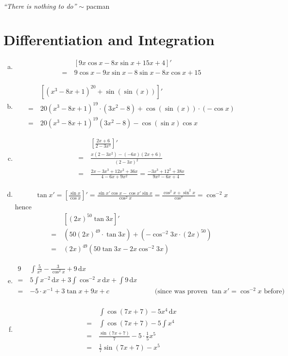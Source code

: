 \documentclass[]{article}
\newcommand\open  {\big(}
\newcommand\close {\big)}
\newcommand\cosx  {\cos x}
\newcommand\sinx  {\sin x}
\newcommand\tanx  {\tan x}
\newcommand\dx    {\,\mathrm{d}x}
\newcommand\op    {^{-1}}
\newcommand\oop    {^{-2}}
\begin{document}
	\section{}
	\textit{``There is nothing to do''} $\sim$ pacman
	\section{Differentiation and Integration}
	\begin{enumerate}[a.]
		\item \begin{align}
			&[9x \cos x - 8x \sin x + 15x + 4]' \\
			= \ &9\cos x - 9x \sin x - 8 \sin x -8x \cos x + 15
		\end{align}
		\item \begin{align}
			&[\left(x^3 - 8x + 1 \right)^{20} + \sin(\sin(x))]' \\
			= \ & 20(x^3 - 8x + 1)^{19} \cdot (3x^2 - 8) + \cos(\sin(x)) \cdot (- \cosx) \\
			= \ & 20(x^3 - 8x + 1)^{19}(3x^2 - 8) - \cos(\sinx)\cosx
		\end{align}
		\item \begin{align}
			& \left[\frac{2x + 6}{2 - 3x^2}\right]' \\
			= \ & \frac{x(2 - 3x^2) - (-6x)(2x + 6)}{(2 - 3x)^2} \\
			= \ & \frac{2x - 3x^3 + 12x^2 + 36x}{4 - 6x + 9x^2} = \frac{-3x^3 + 12^2 + 38x}{9x^2 - 6x + 4}
		\end{align}
		\item \begin{align}
			\tanx' = \left [\frac{\sinx}{\cosx}\right ]' = \frac{\sinx'\cosx - \cosx'\sinx}{\cos^2 x} = \frac{\cos^2x + \sin^2x}{\cos^x} = \cos^{-2} x
		\end{align} 
		hence
		\begin{align}
			&[(2x)^{50}\tan 3x]' \\
			= \ & (50(2x)^{49} \cdot \tan {3x}) + (-\cos^{-2} 3x \cdot (2x)^{50}) \\
			= \ & (2x)^{49}(50\tan 3x - 2x\cos\oop3x)
		\end{align}
		\item \begin{alignat}{9}
			&\int \frac{5}{x^2} - \frac{3}{\cos^2 x} + 9 \dx \\
			= \ & 5\int x^{-2} \dx + 3 \int \cos^{-2}x \dx + \int 9 \dx \\
			= \ & -5 \cdot x\op + 3 \tanx + 9x + c && \quad \open \text{since was proven } \tanx' = \cos^{-2}x \text{ before} \close \\
		\end{alignat}
		\item \begin{align}
			&\int \cos(7x + 7) - 5x^4 \dx \\
			= \ & \int \cos(7x + 7) - 5\int x^4 \\
			= \ & \frac{\sin (7x + 7)}{7}- 5 \cdot \frac{1}{5}x^5 \\
			= \ & \frac{1}{7}\sin(7x + 7) - x^5
		\end{align}
		
	\end{enumerate}
\end{document}
